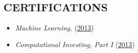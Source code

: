 \documentclass[margin]{res} %
\begin{document}
\begin{resume}
		\section{CERTIFICATIONS}
		\begin{itemize}
			\item {\sl Machine Learning, } (\href{https://www.coursera.org/api/legacyCertificates.v1/spark/statementOfAccomplishment/152~314678/pdf}{2013})
			\item {\sl Computational Investing, Part I } (\href{https://www.coursera.org/api/legacyCertificates.v1/spark/statementOfAccomplishment/364~314678/pdf}{2013})
		\end{itemize}
		\hfill


\end{resume}
\end{document}
